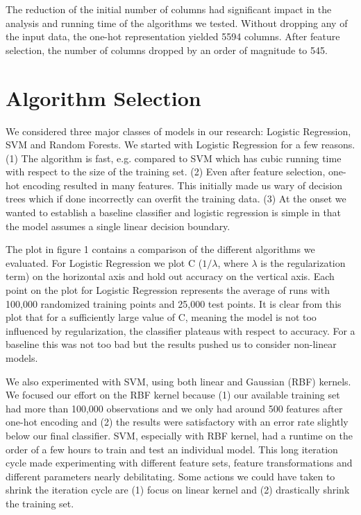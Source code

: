 \documentclass[twoside,11pt]{homework}
\begin{document}
The reduction of the initial number of columns had significant impact in the analysis and running time of the algorithms we tested. Without dropping any of the input data, the one-hot representation yielded 5594 columns. After feature selection, the number of columns dropped by an order of magnitude to 545.  


\section*{Algorithm Selection}



We considered three major classes of models in our research: Logistic Regression,
SVM and Random Forests. We started with Logistic Regression for a few reasons.
(1) The algorithm is fast, e.g. compared to SVM which has cubic running time with respect to the size of the training set.
(2) Even after feature selection, one-hot encoding resulted in 
many features. This initially made us wary of decision trees which if done 
incorrectly can overfit the training data.
(3) At the onset we wanted to establish a baseline classifier and logistic regression is simple in that the model assumes a single linear 
decision boundary. 

The plot in figure 1 contains a comparison of the different algorithms we evaluated. 
For Logistic Regression we plot C ($1/\lambda$, where $\lambda$ is the regularization term) on the horizontal axis and hold out accuracy on the vertical axis.
Each point on the plot for Logistic Regression represents the average of runs with 100,000 randomized training points and 25,000 test points.
It is clear from this plot that for a sufficiently large value of C, meaning the model is not too influenced by regularization,
the classifier plateaus with respect to accuracy. For a baseline this was not too bad but the results pushed us
to consider non-linear models. 

We also experimented with SVM, using both linear and Gaussian (RBF) kernels. We 
focused our effort on the RBF kernel because (1) our available training set had more 
than 100,000 observations and we only had around 500 features after one-hot 
encoding and (2) the results were satisfactory with an error rate slightly below 
our final classifier. SVM, especially with RBF kernel, had a runtime on the order of a few hours to train
and test an individual model. This long iteration cycle made experimenting with different feature sets, feature transformations 
and different parameters nearly debilitating. Some actions we could have 
taken to shrink the iteration cycle are (1) focus on linear kernel and (2) drastically 
shrink the training set.
\end{document}

